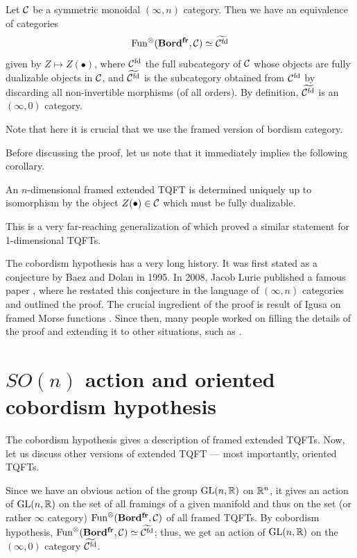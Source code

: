 \begin{theorem}\label{t:cob-hyp}
Let $\mathcal{C}$ be a symmetric monoidal $(\infty, n)$ category. Then we have an
equivalence of categories
$$
  \operatorname{Fun}^{\otimes}(\mathbf{Bord^{fr}}, \mathcal{C})\simeq \widetilde{\mathcal{C}^{{\mathrm{fd}}}}
$$
given by $Z\mapsto Z(\bullet)$, where
$\mathcal{C}^{\mathrm{fd}}$ the full subcategory of $\mathcal{C}$ whose objects are fully dualizable
objects  in $\mathcal{C}$, and   $\widetilde{\mathcal{C}^{{\mathrm{fd}}}}$ is the subcategory obtained from
$\mathcal{C}^{\mathrm{fd}}$ by discarding all non-invertible morphisms \textup{(}of all orders\textup{)}. By
definition, $\widetilde{\mathcal{C}^{{\mathrm{fd}}}}$ is an $(\infty,0)$ category.
\end{theorem}

Note that here it is crucial that we use the framed version of bordism category.

Before discussing the proof, let us note that it immediately implies the
following corollary.
\begin{corollary}
  An $n$-dimensional framed extended  TQFT is  determined uniquely up to
  isomorphism by the object $Z(\bullet)\in \mathcal{C}$ which must be fully
  dualizable.
\end{corollary}
This is a very far-reaching generalization of  which proved a
similar statement for 1-dimensional TQFTs.

The cobordism hypothesis has a very long history. It was first stated as a
conjecture by Baez and Dolan  in 1995. In 2008, Jacob
Lurie published a famous paper , where he  restated this
conjecture in  the language of $(\infty, n)$ categories and outlined the proof.
The crucial ingredient of the proof is result of Igusa on framed Morse functions
. Since then, many people worked on filling the details of the
proof and extending it to other situations, such as .


\section{$SO(n)$ action and oriented cobordism hypothesis}
\label{s:oriented-cobordism-hypothesis}
The cobordism hypothesis gives a description of framed extended TQFTs. Now, let
us discuss other versions of extended TQFT  --- most importantly, oriented
TQFTs.

Since we have an obvious action of the group $\mathrm{GL}(n,\mathbb{R})$ on $\mathbb{R}^n$, it gives an
action of $\mathrm{GL}(n,\mathbb{R})$ on the set of all framings of a given manifold and thus on
the set (or rather $\infty$ category)  $\operatorname{Fun}^{\otimes}(\mathbf{Bord^{fr}}, \mathcal{C})$ of all
framed TQFTs. By cobordism hypothesis,   $\operatorname{Fun}^{\otimes}(\mathbf{Bord^{fr}}, \mathcal{C})\simeq
\widetilde{\mathcal{C}^{{\mathrm{fd}}}}$; thus, we get an action of $\mathrm{GL}(n,\mathbb{R})$ on the $(\infty, 0)$ category
$\widetilde{\mathcal{C}^{{\mathrm{fd}}}}$.

